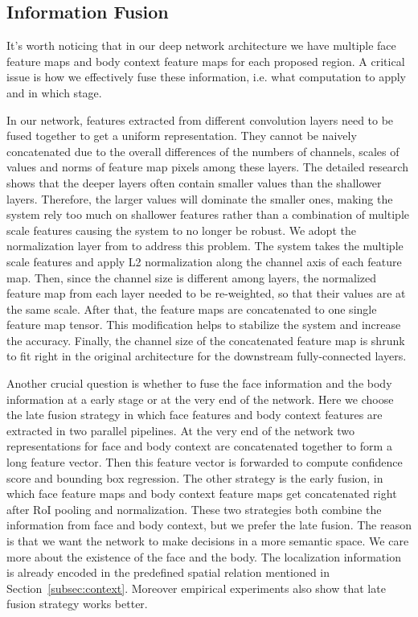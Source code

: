 \documentclass[10pt,journal,cspaper,compsoc]{IEEEtran}
\begin{document}
\subsection{Information Fusion}
\label{subsec:info_fuse}
It's worth noticing that in our deep network architecture we have multiple face feature maps and body context feature maps for each proposed region. A critical issue is how we effectively fuse these information, i.e. what computation to apply and in which stage.





In our network, features extracted from different convolution layers need to be fused together to get a uniform representation. They cannot be naively concatenated due to the overall differences of the numbers of channels, scales of values and norms of feature map pixels among these layers. The detailed research shows that the deeper layers often contain smaller values than the shallower layers. Therefore, the larger values will dominate the smaller ones, making the system rely too much on shallower features rather than a combination of multiple scale features causing the system to no longer be robust. We adopt the normalization layer from \cite{liu2015parsenet} to address this problem. The system takes the multiple scale features and apply L2 normalization along the channel axis of each feature map. Then, since the channel size is different among layers, the normalized feature map from each layer needed to be re-weighted, so that their values are at the same scale. After that, the feature maps are concatenated to one single feature map tensor. This modification helps to stabilize the system and increase the accuracy. Finally, the channel size of the concatenated feature map is shrunk to fit right in the original architecture for the downstream fully-connected layers.

Another crucial question is whether to fuse the face information and the body information at a early stage or at the very end of the network. Here we choose the late fusion strategy in which face features and body context features are extracted in two parallel pipelines. At the very end of the network two representations for face and body context are concatenated together to form a long feature vector. Then this feature vector is forwarded to compute confidence score and bounding box regression. The other strategy is the early fusion, in which face feature maps and body context feature maps get concatenated right after RoI pooling and normalization. These two strategies both combine the information from face and body context, but we prefer the late fusion. The reason is that we want the network to make decisions in a more semantic space. We care more about the existence of the face and the body. The localization information is already encoded in the predefined spatial relation mentioned in Section~\ref{subsec:context}. Moreover empirical experiments also show that late fusion strategy works better.
\end{document}
